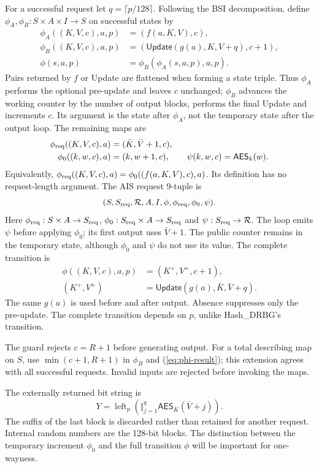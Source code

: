 \documentclass[journal=tosc,preprint,floatrow,nohyperxmp]{iacrtrans}
\numberwithin{lemma}{section}
\numberwithin{proposition}{section}
\newcommand{\Enc}{\mathsf{AES}}
\newcommand{\Upd}{\ensuremath{\mathsf{Update}}}
\numberwithin{equation}{section}
\theoremstyle{definition}
\numberwithin{definition}{section}
\theoremstyle{plain}
\begin{document}
For a successful request let $q=\lceil p/128\rceil$. Following the BSI decomposition, define $\phi_A,\phi_B:S\times A\times I\to S$ on successful states by
\begin{align}
 \phi_A((K,V,c),a,p)&=(f(a,K,V),c),\label{eq:phiA}\\
 \phi_B((K,V,c),a,p)&=(\Upd(g(a),K,V+q),c+1),\label{eq:phiB}\\
 \phi(s,a,p)&=\phi_B(\phi_A(s,a,p),a,p).\label{eq:phi}
\end{align}
Pairs returned by $f$ or Update are flattened when forming a state triple. Thus $\phi_A$ performs the optional pre-update and leaves $c$ unchanged; $\phi_B$ advances the working counter by the number of output blocks, performs the final Update and increments $c$. Its argument is the state after $\phi_A$, not the temporary state after the output loop. The remaining maps are
\begin{align}
 \phi_{\rm req}((K,V,c),a)&=(\bar K,\bar V+1,c),\label{eq:phireq}\\
 \phi_0((k,w,c),a)&=(k,w+1,c),\qquad \psi(k,w,c)=\Enc_k(w).\label{eq:psi}
\end{align}
Equivalently, $\phi_{\rm req}((K,V,c),a)=\phi_0((f(a,K,V),c),a)$. Its definition has no request-length argument. The AIS request 9-tuple is
\[
 (S,S_{\rm req},\mathcal R,A,I,\phi,\phi_{\rm req},\phi_0,\psi).
\]
Here $\phi_{\rm req}:S\times A\to S_{\rm req}$, $\phi_0:S_{\rm req}\times A\to S_{\rm req}$ and $\psi:S_{\rm req}\to\mathcal R$. The loop emits $\psi$ before applying $\phi_0$; its first output uses $\bar V+1$. The public counter remains in the temporary state, although $\phi_0$ and $\psi$ do not use its value. The complete transition is
\begin{align}
 \phi((K,V,c),a,p)&=(K^+,V^+,c+1),\label{eq:phi-result}\\
 (K^+,V^+)&=\Upd(g(a),\bar K,\bar V+q).\label{eq:post}
\end{align}
The same $g(a)$ is used before and after output. Absence suppresses only the pre-update. The complete transition depends on $p$, unlike Hash\_DRBG's transition.

The guard rejects $c=R+1$ before generating output. For a total describing map on $S$, use $\min(c+1,R+1)$ in $\phi_B$ and (\ref{eq:phi-result}); this extension agrees with all successful requests. Invalid inputs are rejected before invoking the maps.

The externally returned bit string is
\begin{equation}
 Y=\operatorname{left}_p\left(\big\Vert_{j=1}^{q}\Enc_{\bar K}(\bar V+j)\right).\label{eq:output}
\end{equation}
The suffix of the last block is discarded rather than retained for another request. Internal random numbers are the 128-bit blocks. The distinction between the temporary increment $\phi_0$ and the full transition $\phi$ will be important for one-wayness.
\end{document}
